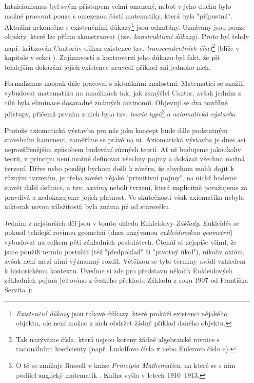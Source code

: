 Intuicionismus byl svým přístupem velmi omezený, neboť v jeho duchu bylo možné pracovat pouze s omezenou částí matematiky, která byla "přípustná". Aktuální nekonečno s existenčními důkazy\footnote{\emph{Existenční důkazy} jsou takové důkazy, které prokáží existenci nějakého objektu, ale není možno z nich obdržet žádný příklad daného objektu.} jsou odmítány. Uznávány jsou pouze objekty, které lze přímo zkonstruovat (tzv. \emph{konstruktivní důkazy}). Proto byl tehdy např. kritizován Cantorův důkaz existence tzv. \emph{transcendentních čísel}\footnote{Tak nazýváme čísla, která nejsou kořeny žádné algebraické rovnice s racionálními koeficienty (např. Ludolfovo číslo $\pi$ nebo Eulerovo číslo $e$).} (blíže v kapitole  v sekci ). Zajímavostí a kontroverzí jeho důkazu byl fakt, že při tehdejším dokázání jejich existence neuvedl příklad ani jednoho nich.\par
Formalismus naopak dále pracoval s aktuálními znalostmi. Matematici se snažili vybudovat matematiku na množinách tak, jak zamýšlel Cantor, avšak jedním z cílů byla eliminace dosavadně známých antinomií. Objevují se dva rozdílné přístupy, přičemž prvním z nich byla tzv. \emph{teorie typů}\footnote{O té se zmiňuje Russell v knize \emph{Principia Mathematica}, na které se s ním podílel anglický matematik . Kniha vyšla v letech 1910--1913.} a \emph{axiomatická výstavba}.\par
Protože axiomatická výstavba pro nás jako koncept bude dále podstatným stavebním kamenem, zaměříme se právě na ni. Axiomatická výstavba je dnes asi nejrozšířenějším způsobem budování různých teorií. Ať už budujeme jakoukoliv teorii, v principu není možné definovat všechny pojmy a dokázat všechna možná tvrzení. Dříve nebo později bychom došli k závěru, že abychom mohli dojít k různým tvrzením, je třeba zavést nějaké "primitivní pojmy", na nichž budeme stavět další definice, a tzv. \emph{axiómy} neboli tvrzení, která implicitně považujeme za pravdivá a nedokazujeme jejich platnost. Ve skutečnosti však axiomatika nebyla nikterak novou záležitostí; byla známa již od starověku.\par
Jedním z nejstarších děl jsou v tomto ohledu Eukleidovy \emph{Základy}. Eukleidés se pokusil tehdejší rovinou geometrii (dnes nazývanou \emph{eukleidovskou geometrií}) vybudovat na celkem pěti základních postulátech. Čtenář si nejspíše všiml, že jsme použili termín postulát (též "předpoklad" či "prvotný úkol"), nikoliv axióm, avšak není mezi nimi významný rozdíl. Většinou se tyto termíny uvádí vzhledem k historickému kontextu. Uveďme si zde pro představu několik Eukleidových základních pojmů (citováno z českého překladu Základů z roku 1907 od Františka Servíta \cite{Eukleides1907}):
